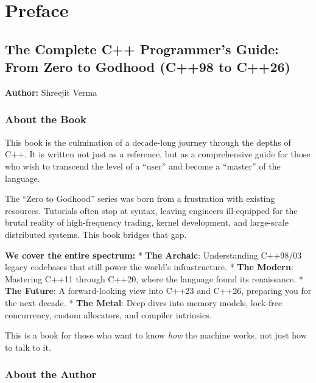 \hypertarget{preface}{%
\chapter{Preface}\label{preface}}

\hypertarget{the-complete-c-programmers-guide-from-zero-to-godhood-c98-to-c26}{%
\section{The Complete C++ Programmer's Guide: From Zero to Godhood
(C++98 to
C++26)}\label{the-complete-c-programmers-guide-from-zero-to-godhood-c98-to-c26}}

\textbf{Author:} Shreejit Verma

\hypertarget{about-the-book}{%
\subsection{About the Book}\label{about-the-book}}

This book is the culmination of a decade-long journey through the depths
of C++. It is written not just as a reference, but as a comprehensive
guide for those who wish to transcend the level of a ``user'' and become
a ``master'' of the language.

The ``Zero to Godhood'' series was born from a frustration with existing
resources. Tutorials often stop at syntax, leaving engineers
ill-equipped for the brutal reality of high-frequency trading, kernel
development, and large-scale distributed systems. This book bridges that
gap.

\textbf{We cover the entire spectrum:} * \textbf{The Archaic}:
Understanding C++98/03 legacy codebases that still power the world's
infrastructure. * \textbf{The Modern}: Mastering C++11 through C++20,
where the language found its renaissance. * \textbf{The Future}: A
forward-looking view into C++23 and C++26, preparing you for the next
decade. * \textbf{The Metal}: Deep dives into memory models, lock-free
concurrency, custom allocators, and compiler intrinsics.

This is a book for those who want to know \emph{how} the machine works,
not just how to talk to it.

\hypertarget{about-the-author}{%
\subsection{About the Author}\label{about-the-author}}

